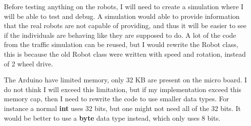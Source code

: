 Before testing anything on the robots, I will need to create a simulation where I will be able to test and debug. A simulation would able to provide information that the real robots are not capable of providing, and thus it will be easier to see if the individuals are behaving like they are supposed to do. A lot of the code from the traffic simulation can be reused, but I would rewrite the Robot class, this is because the old Robot class were written with speed and rotation, instead of 2 wheel drive.

The Arduino have limited memory, only 32 KB are present on the micro board. I do not think I will exceed this limitation, but if my implementation exceed this memory cap, then I need to rewrite the code to use smaller data types. For instance a normal \textbf{int} uses 32 bits, but one might not need all of the 32 bits. It would be better to use a \textbf{byte} data type instead, which only uses 8 bits.

